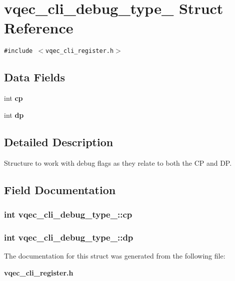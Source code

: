 \section{vqec\_\-cli\_\-debug\_\-type\_\- Struct Reference}
\label{structvqec__cli__debug__type__}
{\tt \#include $<$vqec\_\-cli\_\-register.h$>$}

\subsection*{Data Fields}
\begin{CompactItemize}
\item 
int \bf{cp}
\item 
int \bf{dp}
\end{CompactItemize}


\subsection{Detailed Description}
Structure to work with debug flags as they relate to both the CP and DP. 



\subsection{Field Documentation}
\subsubsection{\setlength{\rightskip}{0pt plus 5cm}int \bf{vqec\_\-cli\_\-debug\_\-type\_\-::cp}}\label{structvqec__cli__debug__type___a1465b6d6b253f7df2f27a66a96af6ed}


\subsubsection{\setlength{\rightskip}{0pt plus 5cm}int \bf{vqec\_\-cli\_\-debug\_\-type\_\-::dp}}\label{structvqec__cli__debug__type___54f0e27e6858e9d1f9942e7bdd1da6f6}




The documentation for this struct was generated from the following file:\begin{CompactItemize}
\item 
\bf{vqec\_\-cli\_\-register.h}\end{CompactItemize}
